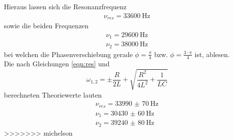 \noindent Hieraus lassen sich die Resonanzfrequenz
\begin{align*}
  \nu_{res}= \SI{33600}{\hertz}
\end{align*}
sowie die beiden Frequenzen
\begin{align*}
  \nu_1 = \SI{29600}{\hertz} \\
  \nu_2 = \SI{38000}{\hertz}
\end{align*}
bei welchen die Phasenverschiebung gerade $\phi = \frac{\pi}{4}$ bzw. $\phi= \frac{3 \cdot \pi}{4}$
ist, ablesen. \\
\noindent Die nach Gleichungen \ref{eqn:res} und
\begin{equation}
  \omega_{1,2} = \pm \frac{R}{2L} + \sqrt{\frac{R^2}{4L^2} + \frac{1}{LC}}
\end{equation}
berechneten Theoriewerte lauten
\begin{align*}
  \nu_{res}= \SI{33990(70)}{\hertz} \\
  \nu_1 = \SI{30430(60)}{\hertz} \\
  \nu_2 = \SI{39240(80)}{\hertz}
\end{align*}
>>>>>>> michelson
